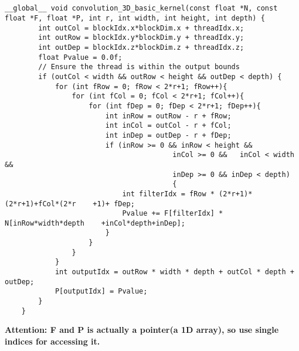 \documentclass{article}
\begin{document}
\subsection{}
\begin{lstlisting}[basicstyle=\small\ttfamily, breaklines=true]
    __global__ void convolution_3D_basic_kernel(const float *N, const float *F, float *P, int r, int width, int height, int depth) {
        int outCol = blockIdx.x*blockDim.x + threadIdx.x;
        int outRow = blockIdx.y*blockDim.y + threadIdx.y;
        int outDep = blockIdx.z*blockDim.z + threadIdx.z;
        float Pvalue = 0.0f;
        // Ensure the thread is within the output bounds
        if (outCol < width && outRow < height && outDep < depth) {
            for (int fRow = 0; fRow < 2*r+1; fRow++){
                for (int fCol = 0; fCol < 2*r+1; fCol++){
                    for (int fDep = 0; fDep < 2*r+1; fDep++){
                        int inRow = outRow - r + fRow;
                        int inCol = outCol - r + fCol;
                        int inDep = outDep - r + fDep;
                        if (inRow >= 0 && inRow < height && 
                                        inCol >= 0 &&   inCol < width && 
                                        inDep >= 0 && inDep < depth)
                                        {
                            int filterIdx = fRow * (2*r+1)*(2*r+1)+fCol*(2*r    +1)+ fDep;
                            Pvalue += F[filterIdx] * N[inRow*width*depth    +inCol*depth+inDep];
                        }
                    }
                }
            }
            int outputIdx = outRow * width * depth + outCol * depth +   outDep;
            P[outputIdx] = Pvalue;
        }
    }
\end{lstlisting}
\textbf{Attention: F and P is actually a pointer(a 1D array), so use single indices for accessing it.}
\end{document}
